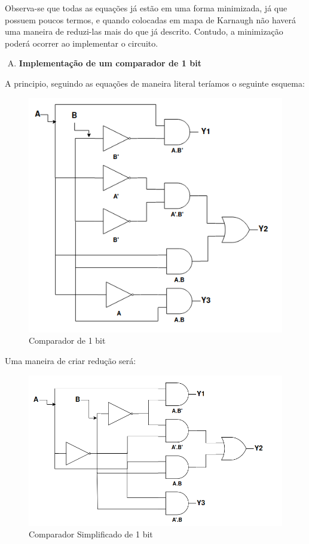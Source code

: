 \documentclass[12pt]{article}
\begin{document}
Observa-se que todas as equações já estão em uma forma minimizada, já que possuem poucos termos, e quando colocadas em mapa de Karnaugh não haverá uma maneira de reduzi-las mais do que já descrito. Contudo, a minimização poderá ocorrer ao implementar o circuito.

\begin{enumerate}[B)]
\item \textbf{Implementação de um comparador de 1 bit}
\end{enumerate}

A principio, seguindo as equações de maneira literal teríamos o seguinte esquema:

\begin{figure}[H]
    \centering
    \includegraphics[width=.9\textwidth]{Exp04/Comparador1Bit.png}
    \caption{Comparador de 1 bit}\label{fig:Comparador1Bit.png}
\end{figure}

Uma maneira de criar redução será:
\begin{figure}[H]
    \centering
    \includegraphics[width=.9\textwidth]{Exp04/Comparador1Simplificado.png}
    \caption{Comparador Simplificado de 1 bit}\label{fig:Comparador1Bit.png}
\end{figure}
\end{document}
